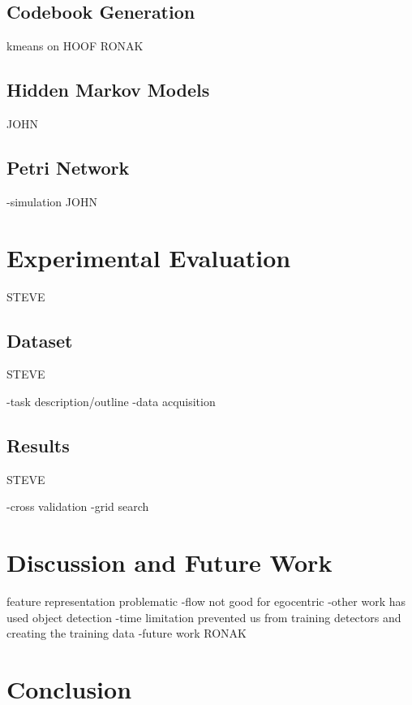 \documentclass[10pt,twocolumn,letterpaper]{article}
\begin{document}
\subsection{Codebook Generation}
kmeans on HOOF
RONAK

\subsection{Hidden Markov Models}
JOHN

\subsection{Petri Network}
-simulation
JOHN
\section{Experimental Evaluation}
STEVE
\subsection{Dataset}
STEVE

-task description/outline
-data acquisition

\subsection{Results}
STEVE 

-cross validation
-grid search


\section{Discussion and Future Work}

feature representation problematic
-flow not good for egocentric
-other work has used object detection
	-time limitation prevented us from training detectors and creating the training data
	-future work
RONAK

\section{Conclusion}



{\small


}
\end{document}
